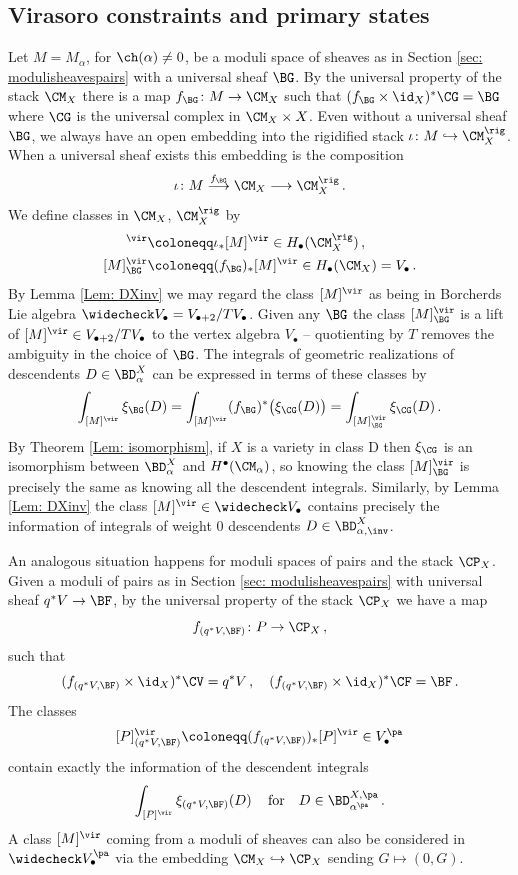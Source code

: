 \subsection{Virasoro constraints and primary states}
\label{subsec: virasoroprimary}

Let $M=M_\alpha$, for $\ch(\alpha)\neq 0$, be a moduli space of sheaves as in Section \ref{sec: modulisheavespairs} with a universal sheaf $\BG$. By the universal property of the stack $\CM_X$ there is a map $f_\BG\colon M\to \CM_X$ such that
$(f_\BG\times \id_X)^\ast \CG=\BG$
where $\CG$ is the universal complex in $\CM_X\times X$. Even without a universal sheaf $\BG$, we always have an open embedding into the rigidified stack $\iota\colon M \hookrightarrow \CM_X^\rig$. When a universal sheaf exists this embedding is the composition
\[\iota\colon M\overset{f_\BG}{\longrightarrow} \CM_X\longrightarrow \CM_X^\rig\,.\]
We define classes in $\CM_X$, $\CM_X^\rig$ by
\begin{align*}
[M]^\vir&\coloneqq \iota_\ast [M]^\vir \in H_\bullet(\CM_X^\rig)\,,\\
[M]^\vir_\BG&\coloneqq (f_\BG)_\ast [M]^\vir \in H_\bullet(\CM_X)=V_\bullet\,.
\end{align*}
By Lemma \ref{Lem: DXinv} we may regard the class $[M]^\vir$ as being in Borcherds Lie algebra $\widecheck V_\bullet=V_{\bullet+2}/TV_\bullet$. Given any $\BG$ the class $[M]^\vir_\BG$ is a lift of $[M]^\vir\in  V_{\bullet+2}/TV_\bullet$ to the vertex algebra $V_\bullet$ -- quotienting by $T$ removes the ambiguity in the choice of $\BG$. The integrals of geometric realizations of descendents $D\in \BD^X_\alpha$ can be expressed in terms of these classes by
\[\int_{[M]^\vir}\xi_\BG(D)=\int_{[M]^\vir}(f_\BG)^\ast \big(\xi_\CG(D)\big)=\int_{[M]^\vir_\BG}\xi_\CG(D)\,.\]
By Theorem \ref{Lem: isomorphism}, if $X$ is a variety in class D then $\xi_\CG$ is an isomorphism between $\BD^X_\alpha$ and $H^\bullet(\CM_\alpha)$, so knowing the class $[M]^\vir_\BG$ is precisely the same as knowing all the descendent integrals. Similarly, by Lemma \ref{Lem: DXinv} the class $[M]^\vir \in \widecheck V_\bullet$ contains precisely the information of integrals of weight 0 descendents $D\in \BD^X_{\alpha, \inv}$.

An analogous situation happens for moduli spaces of pairs and the stack $\CP_X$. Given a moduli of pairs as in Section \ref{sec: modulisheavespairs} with universal sheaf $q^\ast V\to \BF$, by the universal property of the stack $\CP_X$ we have a map
\[f_{(q^\ast V, \BF)}\colon P\to \CP_X\,,\]
such that
\[(f_{(q^\ast V, \BF)}\times \id_X)^\ast \CV=q^\ast V\,,\quad (f_{(q^\ast V, \BF)}\times \id_X)^\ast \CF=\BF\,.\]
The classes
\[[P]^\vir_{(q^\ast V, \BF)}\coloneqq (f_{(q^\ast V, \BF)})_\ast [P]^\vir\in V_\bullet^{\pa}\]
contain exactly the information of the descendent integrals
\[\int_{[P]^\vir}\xi_{(q^\ast V, \BF)}(D)\,\quad\textup{for}\quad D\in \BD^{X, {\pa}}_{\alpha^{\pa}}\,.\]
A class $[M]^\vir$ coming from a moduli of sheaves can also be considered in $\widecheck V_\bullet^{\pa}$ via the embedding $\CM_X\hookrightarrow \CP_X$ sending $G\mapsto (0,G)$.

